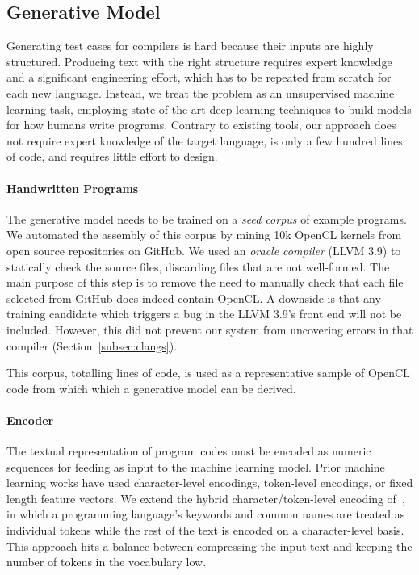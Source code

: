 \subsection{Generative Model}

Generating test cases for compilers is hard because their inputs are highly structured. Producing text with the right structure requires expert knowledge and a significant engineering effort, which has to be repeated from scratch for each new language. Instead, we treat the problem as an unsupervised machine learning task, employing state-of-the-art deep learning techniques to build models for how humans write programs.  Contrary to existing tools, our approach does not require expert knowledge of the target language, is only a few hundred lines of code, and requires little effort to design.


\paragraph{Handwritten Programs} The generative model needs to be trained on a \emph{seed corpus} of example programs. We automated the assembly of this corpus by mining 10k OpenCL kernels from open source repositories on GitHub. We used an \emph{oracle compiler} (LLVM 3.9) to statically check the source files, discarding files that are not well-formed. The main purpose of this step is to remove the need to manually check that each file selected from GitHub does indeed contain OpenCL. A downside is that any training candidate which triggers a bug in the LLVM 3.9's front end will not be included. However, this did not prevent our system from uncovering errors in that compiler (Section~\ref{subsec:clangs}).

This corpus, totalling  lines of code, is used as a representative sample of OpenCL code from which which a generative model can be derived.

\paragraph{Encoder} The textual representation of program codes must be encoded as numeric sequences for feeding as input to the machine learning model.  Prior machine learning works have used character-level encodings, token-level encodings, or fixed length feature vectors. We extend the hybrid character/token-level encoding of~\cite{Cummins2017b}, in which a programming language's keywords and common names are treated as individual tokens while the rest of the text is encoded on a character-level basis. This approach hits a balance between compressing the input text and keeping the number of tokens in the vocabulary low.

